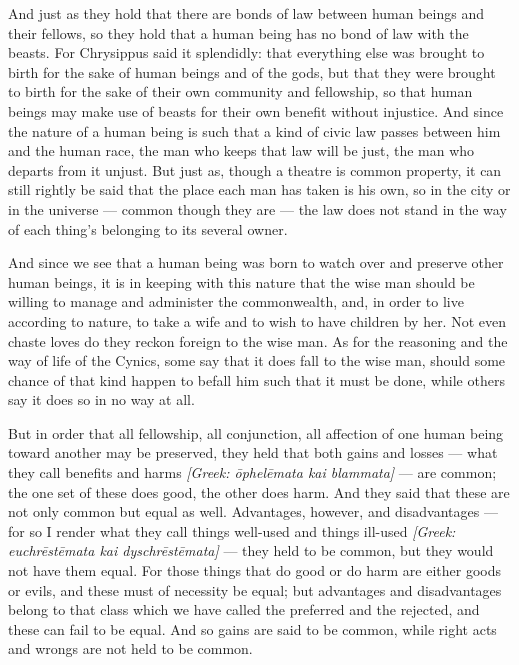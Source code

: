  And just as they hold that there are bonds of law between human beings and their fellows, so they hold that a human being has no bond of law with the beasts. For Chrysippus said it splendidly: that everything else was brought to birth for the sake of human beings and of the gods, but that they were brought to birth for the sake of their own community and fellowship, so that human beings may make use of beasts for their own benefit without injustice. And since the nature of a human being is such that a kind of civic law passes between him and the human race, the man who keeps that law will be just, the man who departs from it unjust. But just as, though a theatre is common property, it can still rightly be said that the place each man has taken is his own, so in the city or in the universe — common though they are — the law does not stand in the way of each thing's belonging to its several owner.

 And since we see that a human being was born to watch over and preserve other human beings, it is in keeping with this nature that the wise man should be willing to manage and administer the commonwealth, and, in order to live according to nature, to take a wife and to wish to have children by her. Not even chaste loves do they reckon foreign to the wise man. As for the reasoning and the way of life of the Cynics, some say that it does fall to the wise man, should some chance of that kind happen to befall him such that it must be done, while others say it does so in no way at all.

 But in order that all fellowship, all conjunction, all affection of one human being toward another may be preserved, they held that both gains and losses — what they call benefits and harms \textit{[Greek: ōphelēmata kai blammata]} — are common; the one set of these does good, the other does harm. And they said that these are not only common but equal as well. Advantages, however, and disadvantages — for so I render what they call things well-used and things ill-used \textit{[Greek: euchrēstēmata kai dyschrēstēmata]} — they held to be common, but they would not have them equal. For those things that do good or do harm are either goods or evils, and these must of necessity be equal; but advantages and disadvantages belong to that class which we have called the preferred and the rejected, and these can fail to be equal. And so gains are said to be common, while right acts and wrongs are not held to be common.

